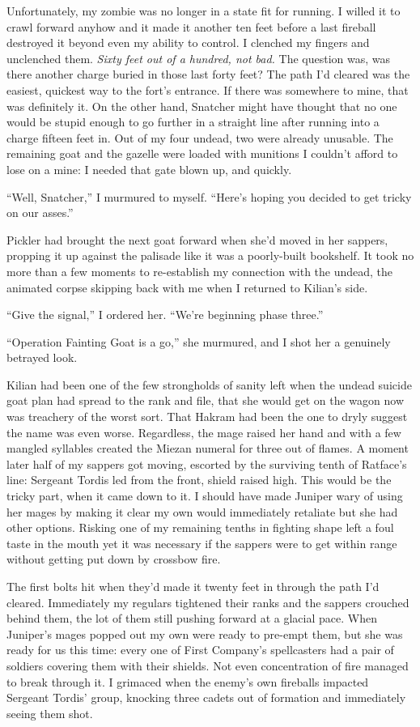 \documentclass[12pt, openany]{book}
\begin{document}
Unfortunately, my zombie was no longer in a state fit for running. I willed it to crawl forward anyhow and it made it another ten feet before a last fireball destroyed it beyond even my ability to control. I clenched my fingers and unclenched them. \textit{Sixty feet out of a hundred, not bad.} The question was, was there another charge buried in those last forty feet? The path I’d cleared was the easiest, quickest way to the fort’s entrance. If there was somewhere to mine, that was definitely it. On the other hand, Snatcher might have thought that no one would be stupid enough to go further in a straight line after running into a charge fifteen feet in. Out of my four undead, two were already unusable. The remaining goat and the gazelle were loaded with munitions I couldn’t afford to lose on a mine: I needed that gate blown up, and quickly.

“Well, Snatcher,” I murmured to myself. “Here’s hoping you decided to get tricky on our asses.”

Pickler had brought the next goat forward when she’d moved in her sappers, propping it up against the palisade like it was a poorly-built bookshelf. It took no more than a few moments to re-establish my connection with the undead, the animated corpse skipping back with me when I returned to Kilian’s side.

“Give the signal,” I ordered her. “We’re beginning phase three.”

“Operation Fainting Goat is a go,” she murmured, and I shot her a genuinely betrayed look.

Kilian had been one of the few strongholds of sanity left when the undead suicide goat plan had spread to the rank and file, that she would get on the wagon now was treachery of the worst sort. That Hakram had been the one to dryly suggest the name was even worse. Regardless, the mage raised her hand and with a few mangled syllables created the Miezan numeral for three out of flames. A moment later half of my sappers got moving, escorted by the surviving tenth of Ratface’s line: Sergeant Tordis led from the front, shield raised high. This would be the tricky part, when it came down to it. I should have made Juniper wary of using her mages by making it clear my own would immediately retaliate but she had other options. Risking one of my remaining tenths in fighting shape left a foul taste in the mouth yet it was necessary if the sappers were to get within range without getting put down by crossbow fire.

The first bolts hit when they’d made it twenty feet in through the path I’d cleared. Immediately my regulars tightened their ranks and the sappers crouched behind them, the lot of them still pushing forward at a glacial pace. When Juniper’s mages popped out my own were ready to pre-empt them, but she was ready for us this time: every one of First Company’s spellcasters had a pair of soldiers covering them with their shields. Not even concentration of fire managed to break through it. I grimaced when the enemy’s own fireballs impacted Sergeant Tordis’ group, knocking three cadets out of formation and immediately seeing them shot.
\end{document}
